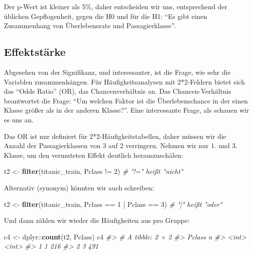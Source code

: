 \documentclass[12pt,ngerman,]{book}
\makeatletter
\newenvironment{Shaded}{\begin{snugshade}}{\end{snugshade}}
\newcommand{\KeywordTok}[1]{\textcolor[rgb]{0.13,0.29,0.53}{\textbf{{#1}}}}
\newcommand{\DecValTok}[1]{\textcolor[rgb]{0.00,0.00,0.81}{{#1}}}
\newcommand{\StringTok}[1]{\textcolor[rgb]{0.31,0.60,0.02}{{#1}}}
\newcommand{\CommentTok}[1]{\textcolor[rgb]{0.56,0.35,0.01}{\textit{{#1}}}}
\newcommand{\NormalTok}[1]{{#1}}
\newenvironment{kframe}{%
\medskip{}
\setlength{\fboxsep}{.8em}
 \def\at@end@of@kframe{}%
 \ifinner\ifhmode%
  \def\at@end@of@kframe{\end{minipage}}%
  \begin{minipage}{\columnwidth}%
 \fi\fi%
 \def\FrameCommand##1{\hskip\@totalleftmargin \hskip-\fboxsep
 \colorbox{shadecolor}{##1}\hskip-\fboxsep
     \hskip-\linewidth \hskip-\@totalleftmargin \hskip\columnwidth}%
 \MakeFramed {\advance\hsize-\width
   \@totalleftmargin\z@ \linewidth\hsize
   \@setminipage}}%
 {\par\unskip\endMakeFramed%
 \at@end@of@kframe}
\renewenvironment{Shaded}{\begin{kframe}}{\end{kframe}}
\makeatother
\begin{document}
Der p-Wert ist kleiner als 5\%, daher entscheiden wir uns, entsprechend
der üblichen Gepflogenheit, gegen die H0 und für die H1: ``Es gibt einen
Zusammenhang von Überlebensrate und Passagierklasse''.

\subsection{Effektstärke}\label{effektstarke}

Abgesehen von der Signifikanz, und interessanter, ist die Frage, wie
sehr die Variablen zusammenhängen. Für Häufigkeitsanalysen mit
2*2-Feldern bietet sich das ``Odds Ratio'' (OR), das Chancenverhältnis
an. Das Chancen-Verhältnis beantwortet die Frage: ``Um welchen Faktor
ist die Überlebenschance in der einen Klasse größer als in der anderen
Klasse?''. Eine interessante Frage, als schauen wir es uns an.

Das OR ist nur definiert für 2*2-Häufigkeitstabellen, daher müssen wir
die Anzahl der Passagierklassen von 3 auf 2 verringern. Nehmen wir nur
1. und 3. Klasse, um den vermuteten Effekt deutlich herauszuschälen:

\begin{Shaded}
\begin{Highlighting}[]
\NormalTok{t2 <-}\StringTok{ }\KeywordTok{filter}\NormalTok{(titanic_train, Pclass !=}\StringTok{ }\DecValTok{2}\NormalTok{)  }\CommentTok{# "!=" heißt "nicht"}
\end{Highlighting}
\end{Shaded}

Alternativ (synonym) könnten wir auch schreiben:

\begin{Shaded}
\begin{Highlighting}[]
\NormalTok{t2 <-}\StringTok{ }\KeywordTok{filter}\NormalTok{(titanic_train, Pclass ==}\StringTok{ }\DecValTok{1} \NormalTok{|}\StringTok{ }\NormalTok{Pclass ==}\StringTok{ }\DecValTok{3}\NormalTok{)  }\CommentTok{# "|" heißt "oder"}
\end{Highlighting}
\end{Shaded}

Und dann zählen wir wieder die Häufigkeiten aus pro Gruppe:

\begin{Shaded}
\begin{Highlighting}[]
\NormalTok{c4 <-}\StringTok{ }\NormalTok{dplyr::}\KeywordTok{count}\NormalTok{(t2, Pclass)}
\NormalTok{c4}
\CommentTok{#> # A tibble: 2 × 2}
\CommentTok{#>   Pclass     n}
\CommentTok{#>    <int> <int>}
\CommentTok{#> 1      1   216}
\CommentTok{#> 2      3   491}
\end{Highlighting}
\end{Shaded}
\end{document}
